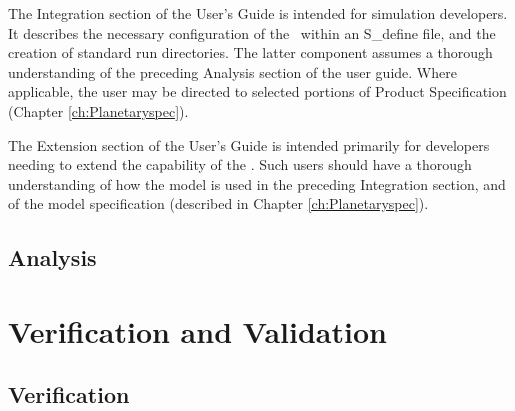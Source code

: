 The Integration section of the User's Guide is intended for simulation
developers.
It describes the necessary configuration of the \PlanetaryDesc\
within an
S\_define file, and the creation of standard run directories.  The
latter
component assumes a thorough understanding of the preceding Analysis
section of the user guide.
Where applicable, the user may be directed to selected portions of
Product Specification (Chapter \ref{ch:Planetaryspec}).

The Extension section of the User's Guide is intended primarily for
developers
needing to extend the capability of the \PlanetaryDesc.  Such users
should have a
thorough understanding of how the model is used in the preceding
Integration section, and of the model
specification (described in Chapter \ref{ch:Planetaryspec}).


\section{Analysis}






\chapter{Verification and
Validation}\label{ch:Planetaryivv}

\section{Verification}





